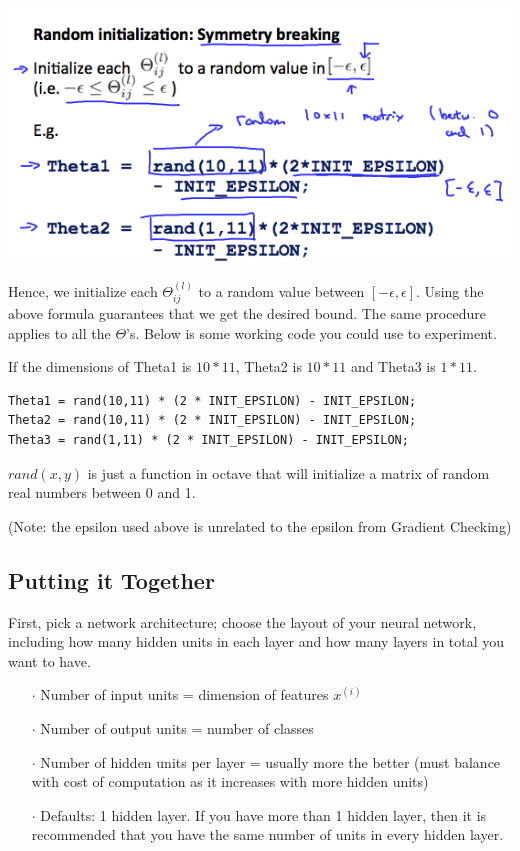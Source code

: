 \documentclass[UTF8]{article}
\begin{document}
\includegraphics[width = \textwidth]{NotePics/9_6_1.png}

Hence, we initialize each $\Theta^{(l)}_{ij}$ to a random value between $[-\epsilon,\epsilon]$. Using the above formula guarantees that we get the desired bound. The same procedure applies to all the $\Theta$'s. Below is some working code you could use to experiment.

If the dimensions of Theta1 is $10*11$, Theta2 is $10*11$ and Theta3 is $1*11$.

\begin{lstlisting}
Theta1 = rand(10,11) * (2 * INIT_EPSILON) - INIT_EPSILON;
Theta2 = rand(10,11) * (2 * INIT_EPSILON) - INIT_EPSILON;
Theta3 = rand(1,11) * (2 * INIT_EPSILON) - INIT_EPSILON;
\end{lstlisting}

$rand(x,y)$ is just a function in octave that will initialize a matrix of random real numbers between 0 and 1.

(Note: the epsilon used above is unrelated to the epsilon from Gradient Checking)

\subsection{Putting it Together}

First, pick a network architecture; choose the layout of your neural network, including how many hidden units in each layer and how many layers in total you want to have.

\begin{itemize}
\item[$\cdot$]Number of input units = dimension of features $x^{(i)}$
\item[$\cdot$]Number of output units = number of classes
\item[$\cdot$]Number of hidden units per layer = usually more the better (must balance with cost of computation as it increases with more hidden units)
\item[$\cdot$]Defaults: 1 hidden layer. If you have more than 1 hidden layer, then it is recommended that you have the same number of units in every hidden layer.
\end{itemize}
\end{document}
